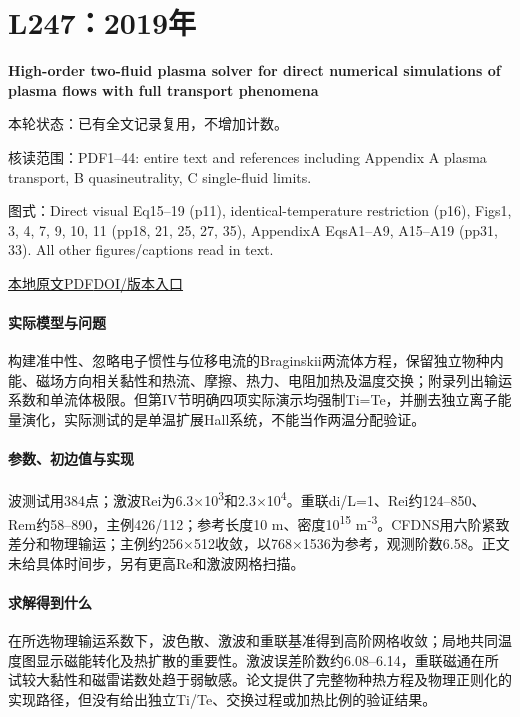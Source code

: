 \section{L247：2019年}\label{paper:L247}

\textbf{High-order two-fluid plasma solver for direct numerical simulations of plasma flows with full transport phenomena}\citep{L247}

\textsf{本轮状态：}已有全文记录复用，不增加计数。

\textsf{核读范围：}PDF1–44: entire text and references including Appendix A plasma transport,  B quasineutrality,  C single-fluid limits.\par\textsf{图式：}Direct visual Eq15–19 (p11),  identical-temperature restriction (p16),  Figs1, 3, 4, 7, 9, 10, 11 (pp18, 21, 25, 27, 35),  AppendixA EqsA1–A9, A15–A19 (pp31, 33). All other figures/captions read in text.

\href{run:../../papers/L247.pdf}{本地原文PDF}\quad\href{https://doi.org/10.1063/1.5082190}{DOI/版本入口}

\paragraph{实际模型与问题}构建准中性、忽略电子惯性与位移电流的Braginskii两流体方程，保留独立物种内能、磁场方向相关黏性和热流、摩擦、热力、电阻加热及温度交换；附录列出输运系数和单流体极限。但第IV节明确四项实际演示均强制Ti=Te，并删去独立离子能量演化，实际测试的是单温扩展Hall系统，不能当作两温分配验证。

\paragraph{参数、初边值与实现}波测试用384点；激波Rei为6.3×10\textsuperscript{3}和2.3×10\textsuperscript{4}。重联di/L=1、Rei约124–850、Rem约58–890，主例426/112；参考长度10 m、密度10\textsuperscript{15} m\textsuperscript{-3}。CFDNS用六阶紧致差分和物理输运；主例约256×512收敛，以768×1536为参考，观测阶数6.58。正文未给具体时间步，另有更高Re和激波网格扫描。

\paragraph{求解得到什么}在所选物理输运系数下，波色散、激波和重联基准得到高阶网格收敛；局地共同温度图显示磁能转化及热扩散的重要性。激波误差阶数约6.08–6.14，重联磁通在所试较大黏性和磁雷诺数处趋于弱敏感。论文提供了完整物种热方程及物理正则化的实现路径，但没有给出独立Ti/Te、交换过程或加热比例的验证结果。

